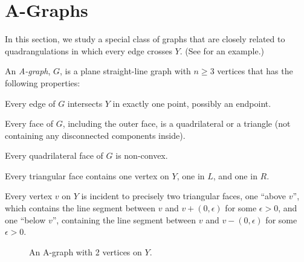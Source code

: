\section{A-Graphs}

In this section, we study a special class of graphs that are closely
related to quadrangulations in which every edge crosses $Y$. (See  for an example.)

\begin{defn}
	An \emph{A-graph}, $G$, is a plane straight-line graph with $n\ge 3$ vertices that has the following properties:
	\begin{compactenum}
		\item Every edge of $G$ intersects $Y$ in exactly one
                  point, possibly an endpoint.
                  \label{p1}
		\item Every face of $G$, including the outer face, is
                  a quadrilateral or a triangle (not containing any
                  disconnected components inside).
		\item Every quadrilateral face of $G$ is non-convex.
		\item Every triangular face contains one vertex
 on $Y$, one in $L$, and one in $R$.  
		\item Every vertex $v$ on $Y$ is incident to precisely
		two triangular faces, one ``above $v$'', which
                contains the line segment between $v$ and
                $v+(0,\epsilon)$ for some $\epsilon>0$, and one ``below
                $v$'', containing the line segment between $v$ and $v-(0,\epsilon)$ for some $\epsilon >0$.
                  \label{p-last}
	\end{compactenum}
\end{defn}

\begin{figure}
		\caption{An A-graph with 2 vertices on $Y$.}
\end{figure}
	

